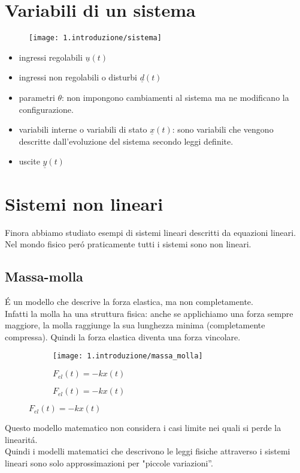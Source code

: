 \documentclass[../main.tex]{subfiles}
\begin{document}
	\section{Variabili di un sistema}
			\begin{figure}[h!]
				\centering
				\texttt{[image: 1.introduzione/sistema]}
			\end{figure}
			\begin{itemize}
				\item ingressi regolabili $ \underline u(t) $
				\item ingressi non regolabili o disturbi $ \underline d(t) $
				\item parametri $ \theta $: non impongono cambiamenti al sistema ma ne modificano la configurazione.
				\item variabili interne o variabili di stato $ \underline x(t) $: sono variabili che vengono descritte dall'evoluzione del sistema secondo leggi definite.
				\item uscite $ \underline y(t) $
			\end{itemize}
		
	\section{Sistemi non lineari}
		Finora abbiamo studiato esempi di sistemi lineari descritti da equazioni lineari. Nel mondo fisico per\'o praticamente tutti i sistemi sono non lineari.
		
	\subsection{Massa-molla}
		\'E un modello che descrive la forza elastica, ma non completamente.\\
		Infatti la molla ha una struttura fisica: anche se applichiamo una forza sempre maggiore, la molla raggiunge la sua lunghezza minima (completamente compressa). Quindi la forza elastica diventa una forza vincolare.\\
		\begin{figure}[h!]
			\begin{subfigure}[b]{0.4\linewidth}
				\texttt{[image: 1.introduzione/massa\_molla]}
				\caption{$F_{el}(t)=-kx(t)$}
			\end{subfigure}
			\begin{subfigure}[b]{0.4\linewidth}
				\caption{$F_{el}(t)=-kx(t)$}
			\end{subfigure}
		\end{figure}
		Questo modello matematico non considera i casi limite nei quali si perde la linearit\'a.\\
		Quindi i modelli matematici che descrivono le leggi fisiche attraverso i sistemi lineari sono solo approssimazioni per "piccole variazioni''.
		
\end{document}
